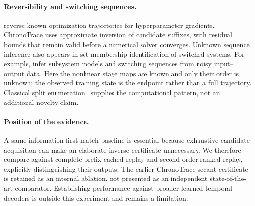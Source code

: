 \paragraph{Reversibility and switching sequences.}
\citet{maclaurin2015} reverse known optimization trajectories for hyperparameter gradients. ChronoTrace uses approximate inversion of candidate suffixes, with residual bounds that remain valid before a numerical solver converges. Unknown sequence inference also appears in set-membership identification of switched systems. For example, \citet{ozay2015} infer subsystem models and switching sequences from noisy input--output data. Here the nonlinear stage maps are known and only their order is unknown; the observed training state is the endpoint rather than a full trajectory. Classical split enumeration~\cite{horowitz1974} supplies the computational pattern, not an additional novelty claim.

\paragraph{Position of the evidence.}
A same-information first-match baseline is essential because exhaustive candidate acquisition can make an elaborate inverse certificate unnecessary. We therefore compare against complete prefix-cached replay and second-order ranked replay, explicitly distinguishing their outputs. The earlier ChronoTrace secant certificate is retained as an internal ablation, not presented as an independent state-of-the-art comparator. Establishing performance against broader learned temporal decoders is outside this experiment and remains a limitation.

